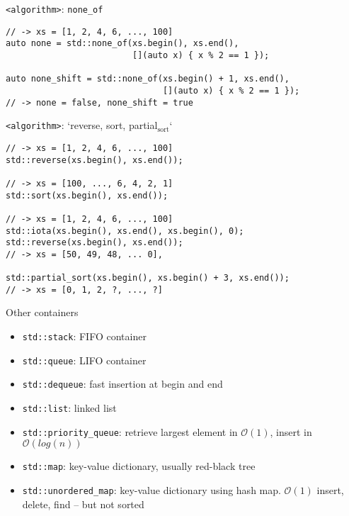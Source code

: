 \documentclass[10pt]{beamer}
\begin{document}
\begin{frame}[fragile,label={sec:orgbcb9b90}]{\texttt{<algorithm>}: \texttt{none\_of}}
 \begin{verbatim}
// -> xs = [1, 2, 4, 6, ..., 100]
auto none = std::none_of(xs.begin(), xs.end(),
                         [](auto x) { x % 2 == 1 });

auto none_shift = std::none_of(xs.begin() + 1, xs.end(),
                               [](auto x) { x % 2 == 1 });
// -> none = false, none_shift = true
\end{verbatim}
\end{frame}

\begin{frame}[fragile,label={sec:org2169c98}]{\texttt{<algorithm>}: `reverse, sort, partial\(_{\text{sort}}\)`}
 \begin{verbatim}
// -> xs = [1, 2, 4, 6, ..., 100]
std::reverse(xs.begin(), xs.end());

// -> xs = [100, ..., 6, 4, 2, 1]
std::sort(xs.begin(), xs.end());

// -> xs = [1, 2, 4, 6, ..., 100]
std::iota(xs.begin(), xs.end(), xs.begin(), 0);
std::reverse(xs.begin(), xs.end());
// -> xs = [50, 49, 48, ... 0], 

std::partial_sort(xs.begin(), xs.begin() + 3, xs.end());
// -> xs = [0, 1, 2, ?, ..., ?]
\end{verbatim}
\end{frame}
\begin{frame}[fragile,label={sec:orgab69d25}]{Other containers}
 \begin{itemize}
\item \texttt{std::stack}: FIFO container
\item \texttt{std::queue}: LIFO container
\item \texttt{std::dequeue}: fast insertion at begin and end
\item \texttt{std::list}: linked list
\item \texttt{std::priority\_queue}: retrieve largest element in \(\mathcal{O}(1)\), insert in
\(\mathcal{O}(log(n))\)
\item \texttt{std::map}: key-value dictionary, usually red-black tree
\item \texttt{std::unordered\_map}: key-value dictionary using hash map. \(\mathcal{O}(1)\)
insert, delete, find -- but not sorted
\end{itemize}
\end{frame}
\end{document}

